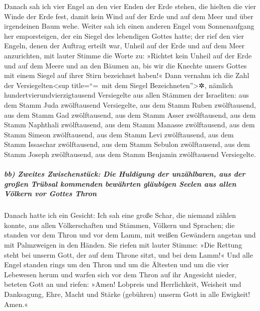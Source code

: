  Danach sah ich vier Engel an den vier Enden der Erde
stehen, die hielten die vier Winde der Erde fest, damit kein Wind auf
der Erde und auf dem Meer und über irgendeinen Baum wehe. 
Weiter sah ich einen anderen Engel vom Sonnenaufgang her emporsteigen,
der ein Siegel des lebendigen Gottes hatte; der rief den vier Engeln,
denen der Auftrag erteilt war, Unheil auf der Erde und auf dem Meer
anzurichten, mit lauter Stimme die Worte zu:  »Richtet
kein Unheil auf der Erde und auf dem Meere und an den Bäumen an, bis wir
die Knechte unsers Gottes mit einem Siegel auf ihrer Stirn bezeichnet
haben!«  Dann vernahm ich die Zahl der
Versiegelten\textless sup title=``=~mit dem Siegel
Bezeichneten''\textgreater✲, nämlich hundertvierundvierzigtausend
Versiegelte aus allen Stämmen der Israeliten:  aus dem
Stamm Juda zwölftausend Versiegelte, aus dem Stamm Ruben zwölftausend,
aus dem Stamm Gad zwölftausend,  aus dem Stamm Asser
zwölftausend, aus dem Stamm Naphthali zwölftausend, aus dem Stamm
Manasse zwölftausend,  aus dem Stamm Simeon zwölftausend,
aus dem Stamm Levi zwölftausend,  aus dem Stamm Issaschar
zwölftausend, aus dem Stamm Sebulon zwölftausend, aus dem Stamm Joseph
zwölftausend, aus dem Stamm Benjamin zwölftausend Versiegelte.

\hypertarget{bb-zweites-zwischenstuxfcck-die-huldigung-der-unzuxe4hlbaren-aus-der-grouxdfen-truxfcbsal-kommenden-bewuxe4hrten-gluxe4ubigen-seelen-aus-allen-vuxf6lkern-vor-gottes-thron}{%
\subparagraph{bb) Zweites Zwischenstück: Die Huldigung der unzählbaren,
aus der großen Trübsal kommenden bewährten gläubigen Seelen aus allen
Völkern vor Gottes
Thron}\label{bb-zweites-zwischenstuxfcck-die-huldigung-der-unzuxe4hlbaren-aus-der-grouxdfen-truxfcbsal-kommenden-bewuxe4hrten-gluxe4ubigen-seelen-aus-allen-vuxf6lkern-vor-gottes-thron}}

 Danach hatte ich ein Gesicht: Ich sah eine große Schar,
die niemand zählen konnte, aus allen Völkerschaften und Stämmen, Völkern
und Sprachen; die standen vor dem Thron und vor dem Lamm, mit weißen
Gewändern angetan und mit Palmzweigen in den Händen.  Sie
riefen mit lauter Stimme: »Die Rettung steht bei unserm Gott, der auf
dem Throne sitzt, und bei dem Lamm!«  Und alle Engel
standen rings um den Thron und um die Ältesten und um die vier Lebewesen
herum und warfen sich vor dem Thron auf ihr Angesicht nieder, beteten
Gott an  und riefen: »Amen! Lobpreis und Herrlichkeit,
Weisheit und Danksagung, Ehre, Macht und Stärke (gebühren) unserm Gott
in alle Ewigkeit! Amen.«

